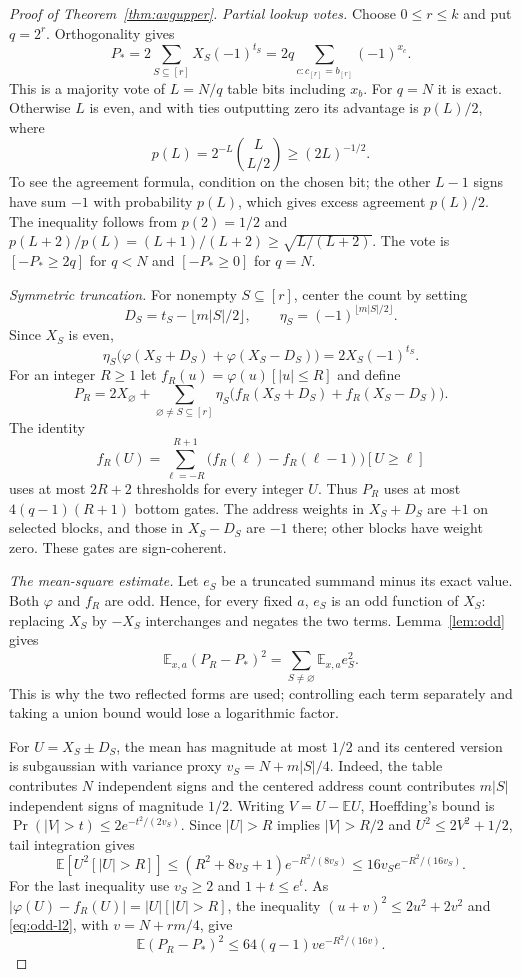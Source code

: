 \documentclass[11pt]{article}
\begin{document}
\begin{proof}[Proof of Theorem~\ref{thm:avgupper}]
\emph{Partial lookup votes.}
Choose $0\le r\le k$ and put $q=2^r$. Orthogonality gives
$$
P_*=2\sum_{S\subseteq[r]}X_S(-1)^{t_S}
 =2q\sum_{c:c_{[r]}=b_{[r]}}(-1)^{x_c}.
$$
This is a majority vote of $L=N/q$ table bits including $x_b$.
For $q=N$ it is exact. Otherwise $L$ is even, and with ties outputting
zero its advantage is $p(L)/2$, where
$$
p(L)=2^{-L}\binom L{L/2}\ge(2L)^{-1/2}.
$$
To see the agreement formula, condition on the chosen bit; the other
$L-1$ signs have sum $-1$ with probability $p(L)$, which gives excess
agreement $p(L)/2$. The inequality follows from $p(2)=1/2$ and
$p(L+2)/p(L)=(L+1)/(L+2)\ge\sqrt{L/(L+2)}$.
The vote is $[-P_*\ge2q]$ for $q<N$ and $[-P_*\ge0]$ for $q=N$.

\emph{Symmetric truncation.}
For nonempty $S\subseteq[r]$, center the count by setting
$$D_S=t_S-\lfloor m|S|/2\rfloor,\qquad
\eta_S=(-1)^{\lfloor m|S|/2\rfloor}.$$
Since $X_S$ is even,
$$
\eta_S\bigl(\varphi(X_S+D_S)+\varphi(X_S-D_S)\bigr)
 =2X_S(-1)^{t_S}.
$$
For an integer $R\ge1$ let $f_R(u)=\varphi(u)[|u|\le R]$ and define
$$
P_R=2X_\varnothing+
\sum_{\varnothing\ne S\subseteq[r]}
\eta_S\bigl(f_R(X_S+D_S)+f_R(X_S-D_S)\bigr).
$$
The identity
$$
f_R(U)=\sum_{\ell=-R}^{R+1}
\bigl(f_R(\ell)-f_R(\ell-1)\bigr)[U\ge\ell]
$$
uses at most $2R+2$ thresholds for every integer $U$.
Thus $P_R$ uses at most $4(q-1)(R+1)$ bottom gates. The address weights
in $X_S+D_S$ are $+1$ on selected blocks, and those in $X_S-D_S$ are
$-1$ there; other blocks have weight zero. These gates are sign-coherent.

\emph{The mean-square estimate.}
Let $e_S$ be a truncated summand minus its exact value.
Both $\varphi$ and $f_R$ are odd. Hence, for every fixed $a$, $e_S$ is
an odd function of $X_S$: replacing $X_S$ by $-X_S$ interchanges and
negates the two terms. Lemma~\ref{lem:odd} gives
\begin{equation}\label{eq:odd-l2}
\mathbb E_{x,a}(P_R-P_*)^2=\sum_{S\ne\varnothing}\mathbb E_{x,a}e_S^2.
\end{equation}
This is why the two reflected forms are used; controlling each term
separately and taking a union bound would lose a logarithmic factor.

For $U=X_S\pm D_S$, the mean has magnitude at most $1/2$ and its centered
version is subgaussian with variance proxy $v_S=N+m|S|/4$.
Indeed, the table contributes $N$ independent signs and the centered
address count contributes $m|S|$ independent signs of magnitude $1/2$.
Writing $V=U-\mathbb EU$, Hoeffding's bound is
$\Pr(|V|>t)\le2e^{-t^2/(2v_S)}$.
Since $|U|>R$ implies $|V|>R/2$ and $U^2\le2V^2+1/2$, tail integration gives
$$
\mathbb E[U^2[|U|>R]]
 \le(R^2+8v_S+1)e^{-R^2/(8v_S)}
 \le16v_Se^{-R^2/(16v_S)}.
$$
For the last inequality use $v_S\ge2$ and $1+t\le e^t$.
As $|\varphi(U)-f_R(U)|=|U|[|U|>R]$, the inequality
$(u+v)^2\le2u^2+2v^2$ and \eqref{eq:odd-l2}, with $v=N+rm/4$, give
$$
\mathbb E(P_R-P_*)^2\le64(q-1)v e^{-R^2/(16v)}.
$$


\end{proof}
\end{document}
